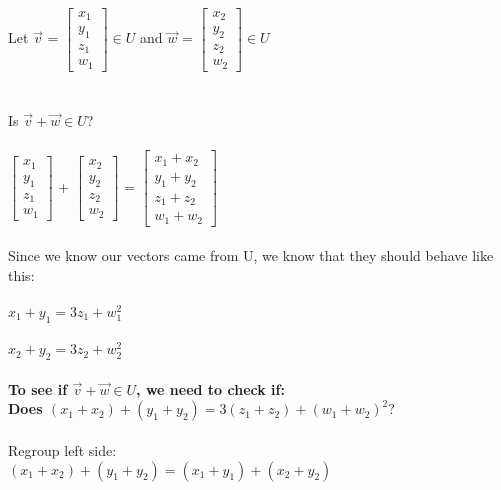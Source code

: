 \documentclass{article}
\begin{document}
{\\
Let $\vec{v}$ = $\left[\begin{matrix}x_{1}\\y_{1}\\z{_1}\\w_{1}\end{matrix}\right] \in U$ and $\vec{w}$ = $\left[\begin{matrix}x_{2}\\y_{2}\\z{_2}\\w_{2}\end{matrix}\right] \in U$ \\
\\
\\
Is $\vec{v} + \vec{w} \in U$?\\
\\
$\left[\begin{matrix}x_{1}\\y_{1}\\z{_1}\\w_{1}\end{matrix}\right]$ + $\left[\begin{matrix}x_{2}\\y_{2}\\z{_2}\\w_{2}\end{matrix}\right]$ = $\left[\begin{matrix}x_{1} + x_{2}\\y_{1} + y_{2}\\z_{1} + z{_2}\\w_{1} + w_{2}\end{matrix}\right]$\\
\\
Since we know our vectors came from U, we know that they should behave like this: \\
\\
$x_{1} + y_{1} = 3z_{1} + w_{1}^{2}$ \\
\\
$x_{2} + y_{2} = 3z_{2} + w_{2}^{2}$\\
\\
\textbf{To see if $\vec{v} + \vec{w} \in U$, we need to check if:}\\
\textbf{Does $(x_{1} + x_{2}) + (y_{1} + y_{2}) = 3(z_{1} + z_{2}) + (w_{1} + w_{2})^{2}$}?\\
\\
Regroup left side:\\
$(x_{1} + x_{2}) + (y_{1} + y_{2}) = (x_{1} + y_{1}) + (x_{2} + y_{2})$\\
}
\end{document}
